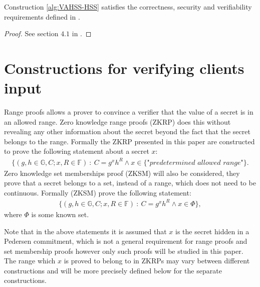 \begin{thm}
\label{thm:VAHSS_CSV}
Construction \ref{alg:VAHSS-HSS} satisfies the correctness, security and verifiability requirements defined in \cite{SumItUp}.
\end{thm}
\begin{proof}
See section $4.1$ in \cite{SumItUp}.
\end{proof}



\section{Constructions for verifying clients input}
\label{sec:RF_theory}
Range proofs allows a prover to convince a verifier that the value of a secret is in an allowed range. Zero knowledge range proofs (ZKRP) does this without revealing any other information about the secret beyond the fact that the secret belongs to the range. Formally the ZKRP presented in this paper are constructed to prove the following statement about a secret $x$:
\begin{align} \label{eq:RP_statement}
    \{(g,h\in\mathds{G},C;x,R\in\mathds{F})\::\:C= g^x h^R \wedge x \in \{\textit{"predetermined allowed range"}\}.
\end{align}
Zero knowledge set memberships proof (ZKSM) will also be considered, they prove that a secret belongs to a set, instead of a range, which does not need to be continuous. Formally  (ZKSM) prove the following statement:
\begin{align} \label{eq:SM_statement}
    \{(g,h\in\mathds{G},C;x,R\in\mathds{F})\::\:C= g^x h^R \wedge x \in \Phi\},
\end{align}
where $\Phi$ is some known set. 
 
Note that in the above statements  it is assumed that $x$ is the secret hidden in a Pedersen commitment, which is not a general requirement for range proofs and set membership proofs however only such proofs will be studied in this paper. The range which $x$ is proved to belong to in ZKRPs may vary between different constructions and will be more precisely defined below for the separate constructions. 


